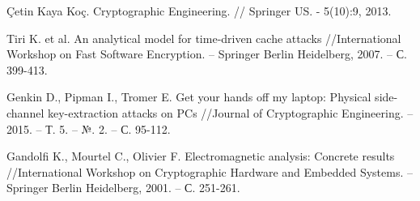 \begin{thebibliography}{00}
  Çetin Kaya Koç.
  Cryptographic Engineering. //
  Springer US. - 5(10):9, 2013.

  Tiri K. et al. An analytical model for time-driven cache attacks //International Workshop on Fast Software Encryption. – Springer Berlin Heidelberg, 2007. – С. 399-413.

  Genkin D., Pipman I., Tromer E. Get your hands off my laptop: Physical side-channel key-extraction attacks on PCs //Journal of Cryptographic Engineering. – 2015. – Т. 5. – №. 2. – С. 95-112. 

  Gandolfi K., Mourtel C., Olivier F. Electromagnetic analysis: Concrete results //International Workshop on Cryptographic Hardware and Embedded Systems. – Springer Berlin Heidelberg, 2001. – С. 251-261.

\end{thebibliography}
\endgroup

\clearpage
